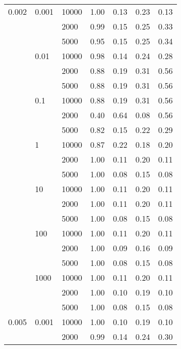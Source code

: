 \begin{tabular}{lllrrrr}
0.002 & 0.001 & 10000 &       1.00 &       0.13 &       0.23 &       0.13 \\
      &       & 2000 &       0.99 &       0.15 &       0.25 &       0.33 \\
      &       & 5000 &       0.95 &       0.15 &       0.25 &       0.34 \\
      & 0.01 & 10000 &       0.98 &       0.14 &       0.24 &       0.28 \\
      &       & 2000 &       0.88 &       0.19 &       0.31 &       0.56 \\
      &       & 5000 &       0.88 &       0.19 &       0.31 &       0.56 \\
      & 0.1 & 10000 &       0.88 &       0.19 &       0.31 &       0.56 \\
      &       & 2000 &       0.40 &       0.64 &       0.08 &       0.56 \\
      &       & 5000 &       0.82 &       0.15 &       0.22 &       0.29 \\
      & 1 & 10000 &       0.87 &       0.22 &       0.18 &       0.20 \\
      &       & 2000 &       1.00 &       0.11 &       0.20 &       0.11 \\
      &       & 5000 &       1.00 &       0.08 &       0.15 &       0.08 \\
      & 10 & 10000 &       1.00 &       0.11 &       0.20 &       0.11 \\
      &       & 2000 &       1.00 &       0.11 &       0.20 &       0.11 \\
      &       & 5000 &       1.00 &       0.08 &       0.15 &       0.08 \\
      & 100 & 10000 &       1.00 &       0.11 &       0.20 &       0.11 \\
      &       & 2000 &       1.00 &       0.09 &       0.16 &       0.09 \\
      &       & 5000 &       1.00 &       0.08 &       0.15 &       0.08 \\
      & 1000 & 10000 &       1.00 &       0.11 &       0.20 &       0.11 \\
      &       & 2000 &       1.00 &       0.10 &       0.19 &       0.10 \\
      &       & 5000 &       1.00 &       0.08 &       0.15 &       0.08 \\
0.005 & 0.001 & 10000 &       1.00 &       0.10 &       0.19 &       0.10 \\
      &       & 2000 &       0.99 &       0.14 &       0.24 &       0.30 \\

\end{tabular}

